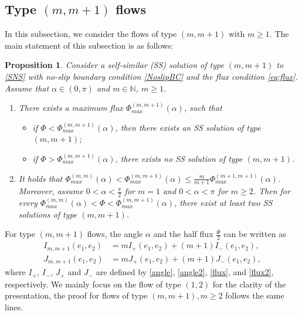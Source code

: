 \documentclass[reqno,12pt]{amsart}
\newtheorem{pro}[theorem]{Proposition}
\begin{document}
\subsection{Type $(m, m+1)$ flows}\label{sectiontype12}
In this subsection, we consider the flows of type $(m, m+1)$ with $m\geq 1$. The main statement of this subsection is as follows:
\begin{pro}\label{Lemmatype12-5}   
Consider a self-similar (SS) solution of type $(m,m+1)$ to \eqref{SNS} with no-slip boundary condition \eqref{NoslipBC} and the flux condition \eqref{eq:flux}.
Assume that $\alpha \in (0, \pi)$ and  $m \in \mathbb{N}$, $m\geq 1$. 
    \begin{enumerate}
        \item There exists a maximum flux  $\Phi_{max}^{(m, m+1)}(\alpha)$, such that 
        \begin{itemize}
            \item if $\Phi < \Phi_{max}^{(m, m+1)}(\alpha)$, then there exists an SS solution of type $(m, m+1)$; 

            \item if $\Phi >\Phi_{max}^{(m, m+1)}(\alpha)$, there exists no SS solution of type $(m, m+1)$. 
        \end{itemize}

        \item It holds that  $\Phi_{max}^{(m, m)}(\alpha) < \Phi_{max}^{(m, m+1)}(\alpha) \leq  \frac{m}{m+1} \Phi_{max}^{(m+1, m+1)}(\alpha)$.  Moreover, assume $0<\alpha<\frac{\pi}{2}$ for $m=1$ and $0<\alpha<\pi$ for $m\geq2$. Then
        for every $\Phi_{max}^{(m, m)}(\alpha) < \Phi < \Phi_{max}^{(m, m+1)} (\alpha)$, there exist at least two SS solutions of type $(m, m+1)$. 
    \end{enumerate}
\end{pro}



 For type $(m,m+1)$ flows, the angle $\alpha$ and the half flux $\frac{\Phi}{2}$ can be written as
\begin{equation}\label{eq:I1,2}
\begin{aligned}
    I_{m,m+1}(e_1, e_2)&= mI_{+}(e_1, e_2) + (m+1)I_{-}(e_1, e_2), \\
     J_{m,m+1}(e_1, e_2) &= mJ_{+}(e_1, e_2) + (m+1)J_{-}(e_1, e_2),
\end{aligned} 
\end{equation}
where $I_{+}$, $I_{-}$, $J_{+}$ and $J_{-}$ are defined by \eqref{angle},  \eqref{angle2}, \eqref{flux}, and \eqref{flux2}, respectively. 
We mainly focus on the flow of type $(1, 2)$ for the clarity of the presentation, the proof for flows of type $(m, m+1), m\geq 2$ follows the same lines.
\end{document}
